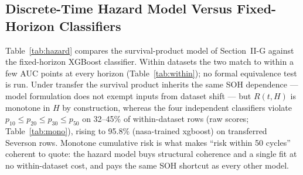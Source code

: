 \begin{table}[!t]
\caption{Same-Chemistry Cross-Laboratory Controls at H=20 (XGBoost, Pooled AUC [CI]). Full Feature Sets Exercise the Zero-Imputation Confound; Common Sets Restrict Both Datasets to the Shared Four-Feature Subset.}
\label{tab:samechem}
\centering
{}
\end{table}

\subsection{Discrete-Time Hazard Model Versus Fixed-Horizon Classifiers}
Table~\ref{tab:hazard} compares the survival-product model of Section~II-G against the fixed-horizon XGBoost classifier. Within datasets the two match to within a few AUC points at every horizon (Table~\ref{tab:within}); no formal equivalence test is run. Under transfer the survival product inherits the same SOH dependence --- model formulation does not exempt inputs from dataset shift --- but $R(t,H)$ is monotone in $H$ by construction, whereas the four independent classifiers violate $p_{10}\le p_{20}\le p_{30}\le p_{50}$ on 32--45\% of within-dataset rows (raw scores; Table~\ref{tab:mono}), rising to 95.8\% (nasa-trained xgboost) on transferred Severson rows. Monotone cumulative risk is what makes ``risk within 50 cycles'' coherent to quote: the hazard model buys structural coherence and a single fit at no within-dataset cost, and pays the same SOH shortcut as every other model.

